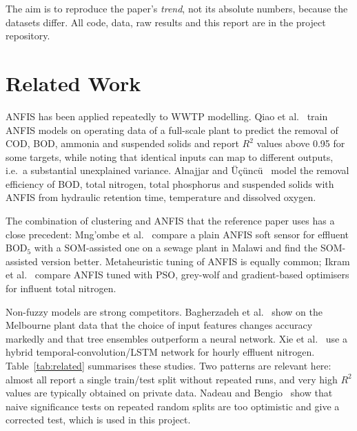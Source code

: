 \documentclass[conference]{IEEEtran}
\newcommand{\Rsq}{$R^2$}
\begin{document}
The aim is to reproduce the paper's \emph{trend}, not its absolute numbers, because the datasets differ. All code, data, raw results and this report are in the project repository.

\section{Related Work}
ANFIS has been applied repeatedly to WWTP modelling. Qiao et al.~\cite{qiao2023} train ANFIS models on operating data of a full-scale plant to predict the removal of COD, BOD, ammonia and suspended solids and report \Rsq{} values above 0.95 for some targets, while noting that identical inputs can map to different outputs, i.e.\ a substantial unexplained variance. Alnajjar and \"U\c{c}\"unc\"u~\cite{alnajjar2022} model the removal efficiency of BOD, total nitrogen, total phosphorus and suspended solids with ANFIS from hydraulic retention time, temperature and dissolved oxygen.

The combination of clustering and ANFIS that the reference paper uses has a close precedent: Mng'ombe et al.~\cite{mngombe2024} compare a plain ANFIS soft sensor for effluent BOD$_5$ with a SOM-assisted one on a sewage plant in Malawi and find the SOM-assisted version better. Metaheuristic tuning of ANFIS is equally common; Ikram et al.~\cite{ikram2024} compare ANFIS tuned with PSO, grey-wolf and gradient-based optimisers for influent total nitrogen.

Non-fuzzy models are strong competitors. Bagherzadeh et al.~\cite{bagherzadeh2021} show on the Melbourne plant data that the choice of input features changes accuracy markedly and that tree ensembles outperform a neural network. Xie et al.~\cite{xie2024} use a hybrid temporal-convolution/LSTM network for hourly effluent nitrogen. Table~\ref{tab:related} summarises these studies. Two patterns are relevant here: almost all report a single train/test split without repeated runs, and very high \Rsq{} values are typically obtained on private data. Nadeau and Bengio~\cite{nadeau2003} show that naive significance tests on repeated random splits are too optimistic and give a corrected test, which is used in this project.
\end{document}
